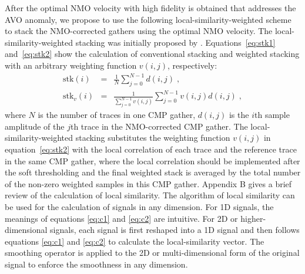 After the optimal NMO velocity with high fidelity is obtained that addresses the AVO anomaly, we propose to use the following local-similarity-weighted scheme to stack the NMO-corrected gathers using the optimal NMO velocity. The local-similarity-weighted stacking was initially proposed by \cite{Liu09}. Equations~\ref{eq:stk1} and~\ref{eq:stk2} show the calculation of conventional stacking \cite[]{Mayne62}
and weighted stacking with an arbitrary weighting function $v(i,j)$, respectively:
      \begin{eqnarray}
          \label{eq:stk1}
          \textrm{stk}(i) & = & \frac{1}{N}\displaystyle\sum_{j=0}^{N-1}d(i,j)\;, \\
          \label{eq:stk2}
          \textrm{stk}_{v}(i) & = & \frac{1}{\displaystyle\sum_{j=0}^{N-1}v(i,j)}\displaystyle\sum_{j=0}^{N-1}v(i,j)d(i,j)\;,
      \end{eqnarray}
where $N$ is the number of
traces in one CMP gather, $d(i,j)$ is the $i$th sample amplitude
of the $j$th trace in the NMO-corrected CMP gather. The
local-similarity-weighted stacking substitutes the weighting
function $v(i,j)$ in equation~\ref{eq:stk2} with the local correlation of each trace and the reference trace in the same CMP gather, where the local correlation should be implemented after the
soft thresholding \cite[]{Donoho95} and the final weighted
stack is averaged by the total number of the non-zero
weighted samples in this CMP gather. Appendix B gives a brief review of the calculation of local similarity. The algorithm of local similarity can be used for the calculation of signals in any dimension. For 1D signals, the meanings of equations \ref{eq:c1} and \ref{eq:c2} are intuitive. For 2D or higher-dimensional signals, each signal is first reshaped into a 1D signal and then follows equations \ref{eq:c1} and \ref{eq:c2} to calculate the local-similarity vector. The smoothing operator is applied to the 2D or multi-dimensional form of the original signal to enforce the smoothness in any dimension. 

